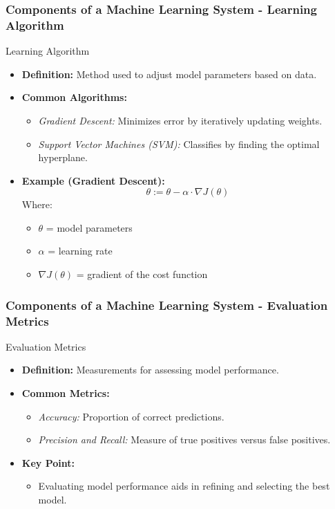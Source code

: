 \documentclass[aspectratio=169]{beamer}
\begin{document}
\begin{frame}[fragile]
    \frametitle{Components of a Machine Learning System - Learning Algorithm}
    \begin{block}{Learning Algorithm}
        \begin{itemize}
            \item \textbf{Definition:} Method used to adjust model parameters based on data.
            \item \textbf{Common Algorithms:}
            \begin{itemize}
                \item \textit{Gradient Descent:} Minimizes error by iteratively updating weights.
                \item \textit{Support Vector Machines (SVM):} Classifies by finding the optimal hyperplane.
            \end{itemize}
            \item \textbf{Example (Gradient Descent):}
            \begin{equation}
                \theta := \theta - \alpha \cdot \nabla J(\theta)
            \end{equation}
            Where:
            \begin{itemize}
                \item $\theta$ = model parameters
                \item $\alpha$ = learning rate
                \item $\nabla J(\theta)$ = gradient of the cost function
            \end{itemize}
        \end{itemize}
    \end{block}
\end{frame}

\begin{frame}[fragile]
    \frametitle{Components of a Machine Learning System - Evaluation Metrics}
    \begin{block}{Evaluation Metrics}
        \begin{itemize}
            \item \textbf{Definition:} Measurements for assessing model performance.
            \item \textbf{Common Metrics:}
            \begin{itemize}
                \item \textit{Accuracy:} Proportion of correct predictions.
                \item \textit{Precision and Recall:} Measure of true positives versus false positives.
            \end{itemize}
            \item \textbf{Key Point:} 
            \begin{itemize}
                \item Evaluating model performance aids in refining and selecting the best model.
            \end{itemize}
        \end{itemize}
    \end{block}
\end{frame}
\end{document}
